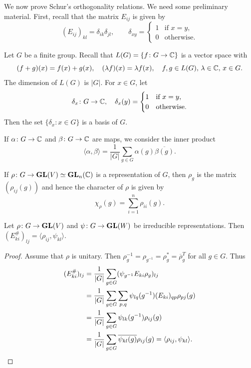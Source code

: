 \section{}

We now prove Schur's orthogonality relations. We need some preliminary material. First, recall that 
the matrix $E_{ij}$ is given by 
\[
(E_{ij})_{kl}=\delta_{ik}\delta_{jl},
\qquad
\delta_{xy}=\begin{cases}
    1 & \text{if $x=y$},\\
    0 & \text{otherwise}.
\end{cases}
\]

Let $G$ be a finite group. 
Recall that $L(G)=\{f\colon G\to\mathbb{C}\}$ is a vector space with
\[
    (f+g)(x)=f(x)+g(x),
    \quad
    (\lambda f)(x)=\lambda f(x),
    \quad 
    f,g\in L(G),\,\lambda\in\mathbb{C},\,x\in G.
\]
The dimension of $L(G)$ is $|G|$. For $x\in G$, 
let 
\[
\delta_x\colon G\to\mathbb{C},\quad \delta_x(y)=\begin{cases}
    1 & \text{if $x=y$},\\
    0 & \text{otherwise.}
    \end{cases}
\]
Then the set
$\{\delta_x:x\in G\}$ is a basis of $G$. 

If $\alpha\colon G\to\mathbb{C}$ and $\beta\colon G\to\mathbb{C}$ 
are maps, we consider the inner product
\[
\langle\alpha,\beta\rangle=\frac{1}{|G|}\sum_{g\in G}\alpha(g)\overline{\beta(g)}.
\]

If $\rho\colon G\to\mathbf{GL}(V)\simeq\mathbf{GL}_n(\mathbb{C})$ is a representation of $G$, then
$\rho_g$ is the matrix $(\rho_{ij}(g))$ and hence the character of $\rho$ is given by
\[
\chi_\rho(g)=\sum_{i=1}^n\rho_{ii}(g).
\]



\begin{lemma}
Let $\rho\colon G\to\mathbf{GL}(V)$ and $\psi\colon G\to\mathbf{GL}(W)$ be irreducible representations. Then
$(E_{ki}^\#)_{lj}=\langle\rho_{ij},\psi_{kl}\rangle$.
\end{lemma}

\begin{proof}
  Assume that $\rho$ is unitary. Then $\rho^{-1}_g=\rho_{g^{-1}}=\rho^*_g=\overline{\rho}_g^T$ for all $g\in G$. 
  Thus  
  \begin{align*}
      (E_{ki}^\#)_{lj} &= \frac{1}{|G|}\sum_{g\in G}(\psi_{g^{-1}}E_{ki}\rho_g)_{lj}\\
      &=\frac{1}{|G|}\sum_{g\in G}\sum_{p,q}\psi_{lq}(g^{-1})(E_{ki})_{qp}\rho_{pj}(g)\\
      &=\frac{1}{|G|}\sum_{g\in G}\psi_{lk}(g^{-1})\rho_{ij}(g)\\
      &=\frac{1}{|G|}\sum_{g\in G}\overline{\psi_{kl}(g)}\rho_{ij}(g)=\langle \rho_{ij},\psi_{kl}\rangle.\qedhere
  \end{align*}
\end{proof}

